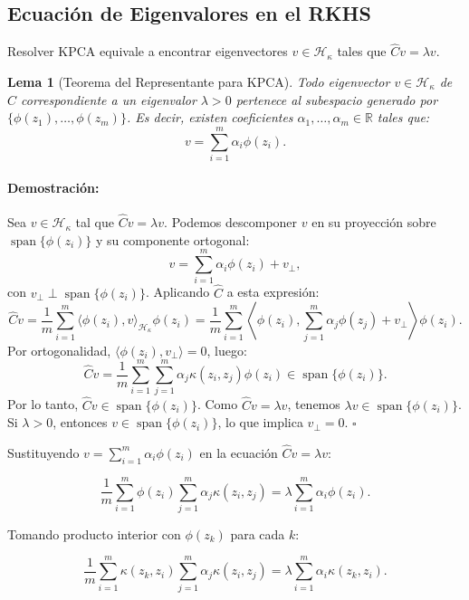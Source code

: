 \documentclass[11pt]{article}
\theoremstyle{plain}
\newtheorem{lemma}[theorem]{Lema}
\newenvironment{proof}{\paragraph{Demostración:}}{\hfill$\square$}
\begin{document}
\subsection{Ecuación de Eigenvalores en el RKHS}

Resolver KPCA equivale a encontrar eigenvectores $v \in \mathcal{H}_\kappa$ tales que $\hat{C} v = \lambda v$.

\begin{lemma}[Teorema del Representante para KPCA]
\label{lemma:representante}
Todo eigenvector $v \in \mathcal{H}_\kappa$ de $\hat{C}$ correspondiente a un eigenvalor $\lambda > 0$ pertenece al subespacio generado por $\{\phi(z_1), \ldots, \phi(z_m)\}$. Es decir, existen coeficientes $\alpha_1, \ldots, \alpha_m \in \mathbb{R}$ tales que:
\[
v = \sum_{i=1}^m \alpha_i \phi(z_i).
\]
\end{lemma}

\begin{proof}
Sea $v \in \mathcal{H}_\kappa$ tal que $\hat{C} v = \lambda v$. Podemos descomponer $v$ en su proyección sobre $\operatorname{span}\{\phi(z_i)\}$ y su componente ortogonal:
\[
v = \sum_{i=1}^m \alpha_i \phi(z_i) + v_\perp,
\]
con $v_\perp \perp \operatorname{span}\{\phi(z_i)\}$. Aplicando $\hat{C}$ a esta expresión:
\[
\hat{C} v = \frac{1}{m} \sum_{i=1}^m \langle \phi(z_i), v \rangle_{\mathcal{H}_\kappa} \phi(z_i) = \frac{1}{m} \sum_{i=1}^m \left\langle \phi(z_i), \sum_{j=1}^m \alpha_j \phi(z_j) + v_\perp \right\rangle \phi(z_i).
\]
Por ortogonalidad, $\langle \phi(z_i), v_\perp \rangle = 0$, luego:
\[
\hat{C} v = \frac{1}{m} \sum_{i=1}^m \sum_{j=1}^m \alpha_j \kappa(z_i, z_j) \phi(z_i) \in \operatorname{span}\{\phi(z_i)\}.
\]
Por lo tanto, $\hat{C} v \in \operatorname{span}\{\phi(z_i)\}$. Como $\hat{C} v = \lambda v$, tenemos $\lambda v \in \operatorname{span}\{\phi(z_i)\}$. Si $\lambda > 0$, entonces $v \in \operatorname{span}\{\phi(z_i)\}$, lo que implica $v_\perp = 0$.
\end{proof}

Sustituyendo $v = \sum_{i=1}^m \alpha_i \phi(z_i)$ en la ecuación $\hat{C} v = \lambda v$:

\[
\frac{1}{m} \sum_{i=1}^m \phi(z_i) \sum_{j=1}^m \alpha_j \kappa(z_i, z_j) = \lambda \sum_{i=1}^m \alpha_i \phi(z_i).
\]

Tomando producto interior con $\phi(z_k)$ para cada $k$:

\[
\frac{1}{m} \sum_{i=1}^m \kappa(z_k, z_i) \sum_{j=1}^m \alpha_j \kappa(z_i, z_j) = \lambda \sum_{i=1}^m \alpha_i \kappa(z_k, z_i).
\]
\end{document}
